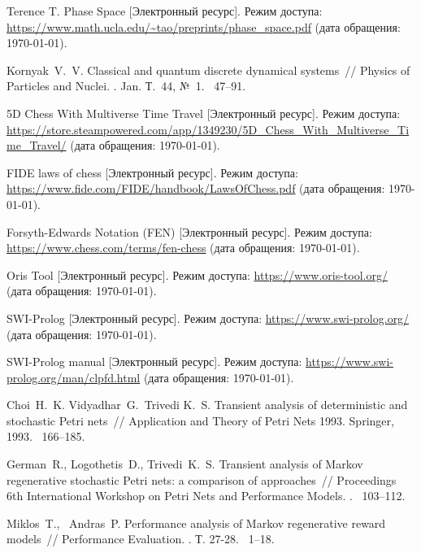 \begin{thebibliography}{}
	Terence T. Phase Space [Электронный ресурс].
	\newblock Режим доступа:
	\url{https://www.math.ucla.edu/~tao/preprints/phase_space.pdf}
	(дата обращения: \today).
	
	Kornyak~V.~V. Classical and quantum discrete dynamical systems~// Physics of Particles and Nuclei.
	.  Jan.
	\newblock Т.~44, {№}~1.
	~47--91.
	
	5D Chess With Multiverse Time Travel [Электронный ресурс].
	\newblock Режим доступа:
	\url{https://store.steampowered.com/app/1349230/5D_Chess_With_Multiverse_Time_Travel/}
	(дата обращения: \today).
	
	FIDE laws of chess [Электронный ресурс].
	\newblock Режим доступа:
	\url{https://www.fide.com/FIDE/handbook/LawsOfChess.pdf} (дата обращения: \today).
	
	Forsyth-Edwards Notation (FEN) [Электронный ресурс].
	\newblock Режим доступа:
	\url{https://www.chess.com/terms/fen-chess} (дата
	обращения: \today).
	
	Oris Tool [Электронный ресурс].
	\newblock Режим доступа: \url{https://www.oris-tool.org/}
	(дата обращения: \today).
	
	SWI-Prolog [Электронный ресурс].
	\newblock Режим доступа: \url{https://www.swi-prolog.org/}
	(дата обращения: \today).
	
	SWI-Prolog manual [Электронный ресурс].
	\newblock Режим доступа:
	\url{https://www.swi-prolog.org/man/clpfd.html} (дата
	обращения: \today).
	
	Choi~H.~K. Vidyadhar~G.~Trivedi K.~S. Transient analysis of
	deterministic and stochastic Petri nets~// Application and Theory of Petri
	Nets 1993.
	\newblock Springer, 1993.
	~166--185.
	
	German~R., Logothetis~D., Trivedi~K.~S. Transient analysis of Markov
	regenerative stochastic Petri nets: a comparison of approaches~// Proceedings
	6th International Workshop on Petri Nets and Performance Models.
	.
	~103--112.
	
	Miklos~T., ~Andras~P. Performance analysis of Markov regenerative reward
	models~// Performance Evaluation.
	.
	\newblock Т. 27-28.
	~1--18.
	
\end{thebibliography}
\endgroup

